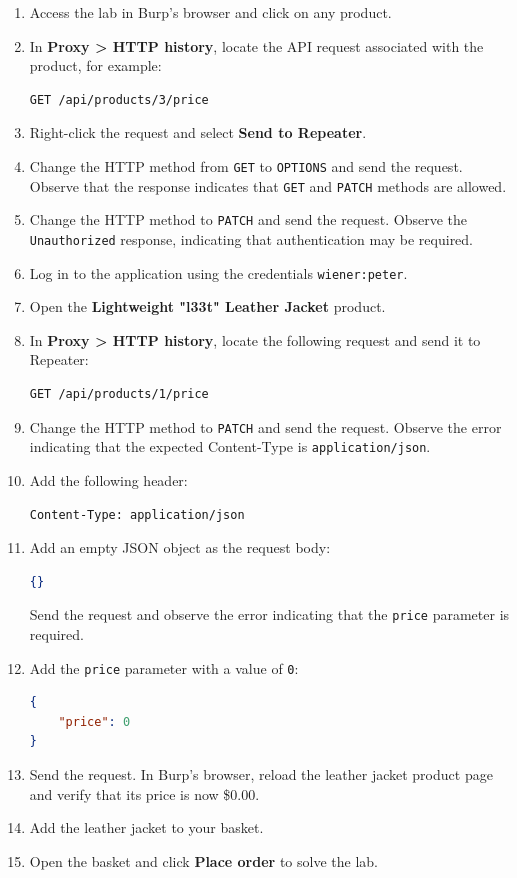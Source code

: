\documentclass[11pt,a4paper]{article}
\begin{document}
\begin{enumerate}
    \item Access the lab in Burp's browser and click on any product.
    \item In \textbf{Proxy > HTTP history}, locate the API request associated with the product, for example:
          \begin{lstlisting}[language=HTTP]
GET /api/products/3/price
    \end{lstlisting}
    \item Right-click the request and select \textbf{Send to Repeater}.
    \item Change the HTTP method from \texttt{GET} to \texttt{OPTIONS} and send the request. Observe that the response indicates that \texttt{GET} and \texttt{PATCH} methods are allowed.
    \item Change the HTTP method to \texttt{PATCH} and send the request. Observe the \texttt{Unauthorized} response, indicating that authentication may be required.
    \item Log in to the application using the credentials \texttt{wiener:peter}.
    \item Open the \textbf{Lightweight "l33t" Leather Jacket} product.
    \item In \textbf{Proxy > HTTP history}, locate the following request and send it to Repeater:
          \begin{lstlisting}[language=HTTP]
GET /api/products/1/price
    \end{lstlisting}
    \item Change the HTTP method to \texttt{PATCH} and send the request. Observe the error indicating that the expected Content-Type is \texttt{application/json}.
    \item Add the following header:
          \begin{lstlisting}[language=HTTP]
Content-Type: application/json
    \end{lstlisting}
    \item Add an empty JSON object as the request body:
          \begin{lstlisting}[language=JSON]
{}
    \end{lstlisting}
          Send the request and observe the error indicating that the \texttt{price} parameter is required.
    \item Add the \texttt{price} parameter with a value of \texttt{0}:
          \begin{lstlisting}[language=JSON]
{
    "price": 0
}
    \end{lstlisting}
    \item Send the request. In Burp's browser, reload the leather jacket product page and verify that its price is now \$0.00.
    \item Add the leather jacket to your basket.
    \item Open the basket and click \textbf{Place order} to solve the lab.
\end{enumerate}
\end{document}
